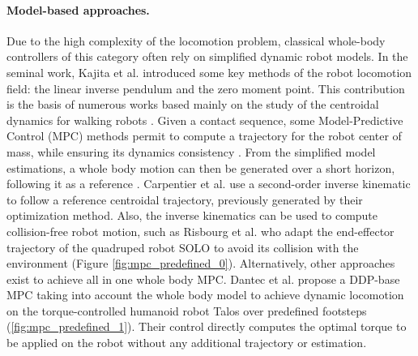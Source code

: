 \paragraph{Model-based approaches.}
Due to the high complexity of the locomotion problem, classical whole-body controllers of this category often rely on simplified dynamic robot models.
In the seminal work, Kajita et al. \cite{kajita2003ZMP} introduced some key methods of the robot locomotion field: the linear inverse pendulum and the zero moment point.
This contribution is the basis of numerous works based mainly on the study of the centroidal dynamics for walking robots \cite{Tonneau2018_2PAC, caron_2018_whole_body}.
Given a contact sequence, some Model-Predictive Control (MPC) methods permit to compute a trajectory for the robot center of mass, while ensuring its dynamics consistency \cite{carpentier2016_versatile_efficient, pierre_alexandre_2021}.
From the simplified model estimations, a whole body motion can then be generated over a short horizon, following it as a reference \cite{felix_and_avadesh_2019}.
Carpentier et al. \cite{loco3d} use a second-order inverse kinematic to follow a reference centroidal trajectory, previously generated by their optimization method.
Also, the inverse kinematics can be used to compute collision-free robot motion, such as Risbourg et al. \cite{fanny_mip_solo} who adapt the end-effector trajectory of the quadruped robot SOLO to avoid its collision with the environment (Figure \ref{fig:mpc_predefined_0}). %
Alternatively, other approaches exist to achieve all in one whole body MPC. Dantec et al. \cite{ewen_2022} propose a DDP-base MPC taking into account the whole body model to achieve dynamic locomotion on the torque-controlled humanoid robot Talos over predefined footsteps (\ref{fig:mpc_predefined_1}). Their control directly computes the optimal torque to be applied on the robot without any additional trajectory or estimation.



